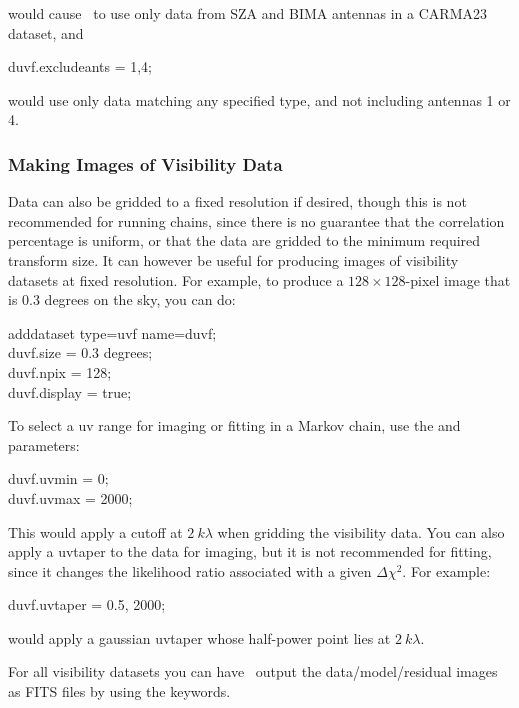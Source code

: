 would cause \climax\ to use only data from SZA and BIMA antennas in a
CARMA23 dataset, and

\begin{myindentpar}{3cm}
duvf.excludeants = 1,4;
\end{myindentpar}

would use only data matching any specified type, and not including
antennas 1 or 4.

\subsubsection{Making Images of Visibility Data}

Data can also be gridded to a fixed resolution if desired, though this
is not recommended for running chains, since there is no guarantee
that the correlation percentage is uniform, or that the data are
gridded to the minimum required transform size.  It can however be
useful for producing images of visibility datasets at fixed
resolution.  For example, to produce a $128\times128$-pixel image that
is 0.3 degrees on the sky, you can do:

\begin{myindentpar}{3cm}
adddataset type=uvf name=duvf;\\
duvf.size = 0.3 degrees;\\
duvf.npix = 128;\\
duvf.display = true;
\end{myindentpar}

To select a uv range for imaging or fitting in a Markov chain, use the
 and  parameters:

\begin{myindentpar}{3cm}
duvf.uvmin = 0;\\
duvf.uvmax = 2000;
\end{myindentpar}

This would apply a cutoff at $2~k\lambda$ when gridding the visibility
data.  You can also apply a uvtaper to the data for imaging, but it is
not recommended for fitting, since it changes the likelihood ratio
associated with a given $\Delta\chi^2$.  For example:

\begin{myindentpar}{3cm}
duvf.uvtaper = 0.5, 2000;
\end{myindentpar}

would apply a gaussian uvtaper whose half-power point lies at
$2~k\lambda$.  

For all visibility datasets you can have \climax\ output the
data/model/residual images as FITS files by using the
 keywords. 

